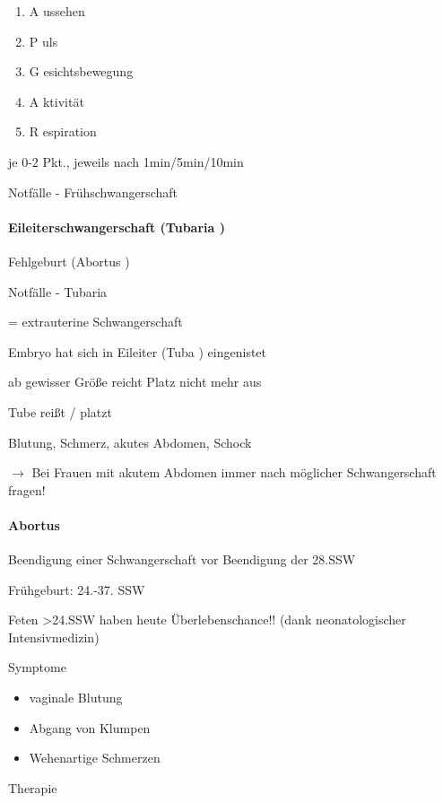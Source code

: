 \documentclass{article}
\begin{document}
\begin{enumerate}
\item A ussehen

\item P uls

\item G esichtsbewegung

\item A ktivit\"at

\item R espiration

\end{enumerate}
je 0-2 Pkt., jeweils nach 1min/5min/10min

Notf\"alle - Fr\"uhschwangerschaft

\paragraph{Eileiterschwangerschaft (Tubaria )}
Fehlgeburt (Abortus )

Notf\"alle - Tubaria

= extrauterine Schwangerschaft

Embryo hat sich in Eileiter (Tuba ) eingenistet

ab gewisser Gr\"o{\ss}e reicht Platz nicht mehr aus

Tube rei{\ss}t / platzt

Blutung, Schmerz, akutes Abdomen, Schock

${\rightarrow}$ Bei Frauen mit akutem Abdomen immer nach m\"oglicher
Schwangerschaft fragen!

\paragraph{Abortus}
Beendigung einer Schwangerschaft vor Beendigung der 28.SSW

Fr\"uhgeburt: 24.-37. SSW

Feten {\textgreater}24.SSW haben heute  \"Uberlebenschance!! (dank 
neonatologischer Intensivmedizin)

Symptome

\begin{itemize}
\item vaginale Blutung

\item Abgang von Klumpen

\item Wehenartige Schmerzen

\end{itemize}
Therapie
\end{document}
